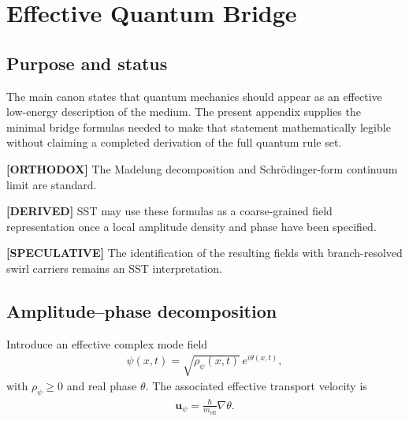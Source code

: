 \documentclass[11pt]{article}
\theoremstyle{definition}
\theoremstyle{plain}
\theoremstyle{remark}
\begin{document}
    \section{Effective Quantum Bridge}
    \label{sec:appendix_quantum_bridge}
    
    \subsection{Purpose and status}
        The main canon states that quantum mechanics should appear as an effective low-energy description of the medium. The present appendix supplies the minimal bridge formulas needed to make that statement mathematically legible without claiming a completed derivation of the full quantum rule set.
        
        \textbf{[ORTHODOX]} The Madelung decomposition and Schr\"odinger-form continuum limit are standard.
        
        \textbf{[DERIVED]} SST may use these formulas as a coarse-grained field representation once a local amplitude density and phase have been specified.
        
        \textbf{[SPECULATIVE]} The identification of the resulting fields with branch-resolved swirl carriers remains an SST interpretation.
    
    \subsection{Amplitude--phase decomposition}
        Introduce an effective complex mode field
        \begin{align}
            \psi(x,t) = \sqrt{\rho_\psi(x,t)}\,e^{i\theta(x,t)},
            \label{eq:madelung_ansatz_appendix}
        \end{align}
        with \(\rho_\psi \ge 0\) and real phase \(\theta\). The associated effective transport velocity is
        \begin{align}
            \mathbf{u}_\psi
            =
            \frac{\hbar}{m_{\mathrm{eff}}}\nabla\theta.
            \label{eq:effective_phase_velocity}
        \end{align}
        
\end{document}

